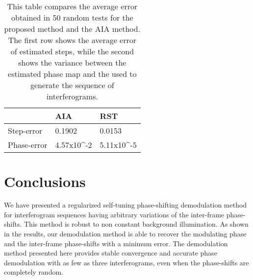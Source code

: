 \documentclass[letterpaper,12pt]{article}   %
\begin{document}
\begin{table}
	\begin{center}
		\begin{tabular}{|l|l|l|}
		\hline
		            & AIA    & RST 	    \\ \hline \hline
		Step-error  & 0.1902 & 0.0153	\\ \hline
		Phase-error & 4.57x10^{-2} & 5.11x10^{-5} \\ \hline
		
		\end{tabular}
	\end{center}
	\caption{This table compares the average error obtained in 50 random tests for the proposed method and the AIA method. The first row shows the average error of estimated steps, while the second shows the variance between the estimated phase map and the used to generate the sequence of interferograms.} 
	\label{error_table}
\end{table}

\section{Conclusions}
We have presented a regularized self-tuning phase-shifting demodulation method for interferogram sequences having arbitrary variations of the inter-frame phase-shifts. This method is robust to non constant background illumination. As shown in the results, our demodulation method is able to recover the modulating phase and the inter-frame phase-shifts with a minimum error. The demodulation method presented here provides stable convergence and accurate phase demodulation with as few as three interferograms, even when the phase-shifts are completely random.



\end{document}
